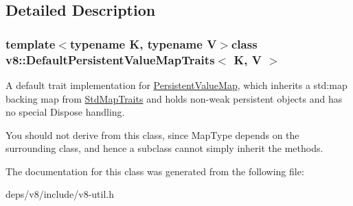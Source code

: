 \subsection{Detailed Description}
\subsubsection*{template$<$typename K, typename V$>$class v8\+::\+Default\+Persistent\+Value\+Map\+Traits$<$ K, V $>$}

A default trait implementation for \hyperlink{classv8_1_1_persistent_value_map}{Persistent\+Value\+Map}, which inherits a std\+:map backing map from \hyperlink{classv8_1_1_std_map_traits}{Std\+Map\+Traits} and holds non-\/weak persistent objects and has no special Dispose handling.

You should not derive from this class, since Map\+Type depends on the surrounding class, and hence a subclass cannot simply inherit the methods. 

The documentation for this class was generated from the following file\+:\begin{DoxyCompactItemize}
\item 
deps/v8/include/v8-\/util.\+h\end{DoxyCompactItemize}
